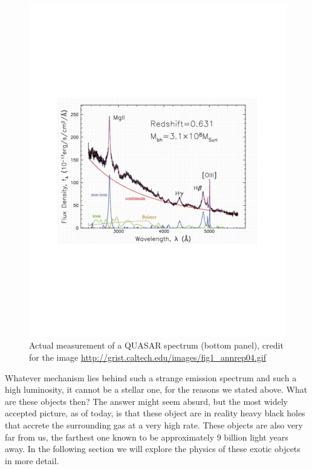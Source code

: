 \begin{figure}
\begin{center}
\includegraphics[scale=0.8]{Draw/quasar_spec_real.pdf}
\end{center}
\caption{Actual measurement of a QUASAR spectrum (bottom panel), credit for the image \url{http://grist.caltech.edu/images/fig1_annrep04.gif}}
\label{quasarspecreal}
\end{figure}  

\noindent Whatever mechanism lies behind such a strange emission spectrum and such a high luminosity, it cannot be a stellar one, for the reasons we stated above. What are these objects then? The answer might seem absurd, but the most widely accepted picture, as of today, is that these object are in reality heavy black holes that accrete the surrounding gas at a very high rate. These objects are also very far from us, the farthest one known to be approximately 9 billion light years away. In the following section we will explore the physics of these exotic objcets in more detail. 

